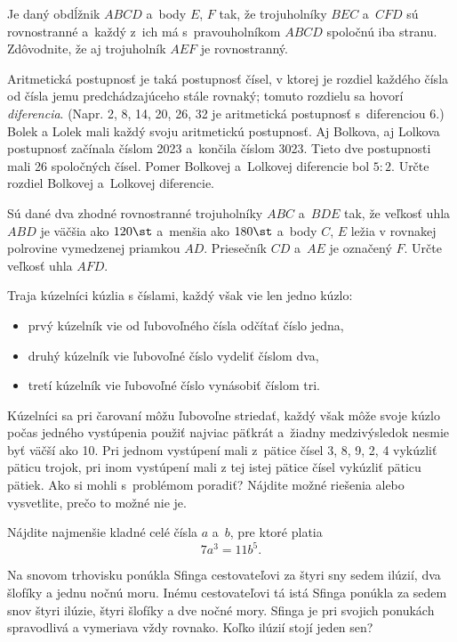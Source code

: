 {%
Je daný obdĺžnik $ABCD$ a~body $E$, $F$ tak, že trojuholníky $BEC$ a~$CFD$ sú rovnostranné a~každý z~ich má s~pravouholníkom $ABCD$ spoločnú iba stranu.
Zdôvodnite, že aj trojuholník $AEF$ je rovnostranný.}

{%
Aritmetická postupnosť je taká postupnosť čísel, v ktorej je rozdiel každého čísla od čísla jemu predchádzajúceho stále rovnaký; tomuto rozdielu sa hovorí {\it diferencia\/}.
(Napr. 2, 8, 14, 20, 26, 32 je aritmetická postupnosť s~diferenciou 6.)
Bolek a Lolek mali každý svoju aritmetickú postupnosť.
Aj Bolkova, aj Lolkova postupnosť začínala číslom 2023 a~končila číslom 3023.
Tieto dve postupnosti mali 26 spoločných čísel.
Pomer Bolkovej a~Lolkovej diferencie bol $5:2$.
Určte rozdiel Bolkovej a~Lolkovej diferencie.}

{%
Sú dané dva zhodné rovnostranné trojuholníky $ABC$ a~$BDE$ tak, že veľkosť uhla $ABD$ je väčšia ako $120\st$ a~menšia ako $180\st$ a~body $C$, $E$ ležia v rovnakej polrovine vymedzenej priamkou $AD$.
Priesečník $CD$ a~$AE$ je označený $F$.
Určte veľkosť uhla $AFD$.
%
}

{%
Traja kúzelníci kúzlia s číslami, každý však vie len jedno kúzlo:
\begin{itemize}
\item prvý kúzelník vie od ľubovoľného čísla odčítať číslo jedna,
\item druhý kúzelník vie ľubovoľné číslo vydeliť číslom dva,
\item tretí kúzelník vie ľubovoľné číslo vynásobiť číslom tri.
\end{itemize}
Kúzelníci sa pri čarovaní môžu ľubovoľne striedať, každý však môže svoje kúzlo počas jedného vystúpenia použiť najviac päťkrát
a~žiadny medzivýsledok nesmie byť väčší ako 10.
Pri jednom vystúpení mali z~pätice čísel 3, 8, 9, 2, 4 vykúzliť päticu trojok,
pri inom vystúpení mali z tej istej pätice čísel vykúzliť päticu pätiek.
Ako si mohli s~problémom poradiť?
Nájdite možné riešenia alebo vysvetlite, prečo to možné nie je.}

{%
Nájdite najmenšie kladné celé čísla $a$ a~$b$, pre ktoré platia
$$
7a^3=11b^5.
$$}

{%
Na snovom trhovisku ponúkla Sfinga cestovateľovi za štyri sny sedem ilúzií, dva šlofíky a jednu nočnú moru.
Inému cestovateľovi tá istá Sfinga ponúkla za sedem snov štyri ilúzie, štyri šlofíky a dve nočné mory.
Sfinga je pri svojich ponukách spravodlivá a vymeriava vždy rovnako.
Koľko ilúzií stojí jeden sen?}

